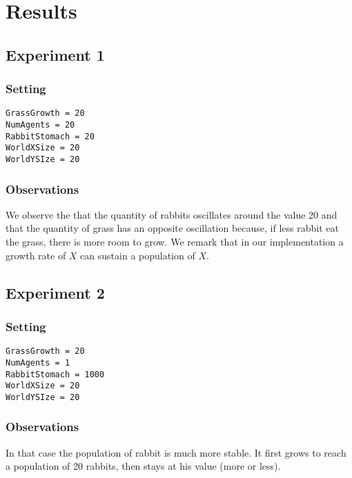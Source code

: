 \documentclass[11pt]{article}
\begin{document}
\section{Results}

\subsection{Experiment 1}

\subsubsection{Setting}
\begin{verbatim}
GrassGrowth = 20
NumAgents = 20
RabbitStomach = 20
WorldXSize = 20
WorldYSIze = 20
\end{verbatim}
\subsubsection{Observations}
We observe the that the quantity of rabbits oscillates around the value 20 and that the quantity of grass has an opposite oscillation because, if less rabbit eat the grass, there is more room to grow. We remark that in our implementation a growth rate of $X$ can sustain a population of $X$.

\subsection{Experiment 2}
\subsubsection{Setting}
\begin{verbatim}
GrassGrowth = 20
NumAgents = 1
RabbitStomach = 1000
WorldXSize = 20
WorldYSIze = 20
\end{verbatim}
\subsubsection{Observations}
In that case the population of rabbit is much more stable. It first grows to reach a population of 20 rabbits, then stays at his value (more or less).
\end{document}
